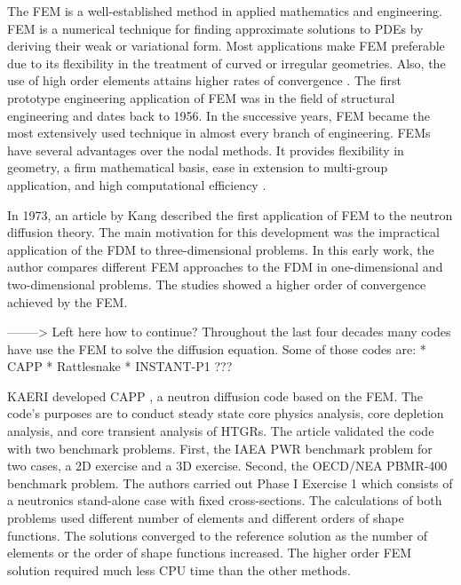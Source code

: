 \documentclass[11pt,letterpaper]{article}
\begin{document}
The \gls{FEM} is a well-established method in applied mathematics and engineering.
\gls{FEM} is a numerical technique for finding approximate solutions to \glspl{PDE} by deriving their weak or variational form.
Most applications make \gls{FEM} preferable due to its flexibility in the treatment of curved or irregular geometries.
Also, the use of high order elements attains higher rates of convergence \cite{cavdar_finite_2004}.
The first prototype engineering application of \gls{FEM} was in the field of structural engineering and dates back to 1956.
In the successive years, \gls{FEM} became the most extensively used technique in almost every branch of engineering.
\glspl{FEM} have several advantages over the nodal methods.
It provides flexibility in geometry, a firm mathematical basis, ease in extension to multi-group application, and high computational efficiency \cite{lee_development_2008}.

In 1973, an article by Kang \cite{kang_finite_1973} described the first application of \gls{FEM} to the neutron diffusion theory.
The main motivation for this development was the impractical application of the \gls{FDM} to three-dimensional problems.
In this early work, the author compares different \gls{FEM} approaches to the \gls{FDM} in one-dimensional and two-dimensional problems.
The studies showed a higher order of convergence achieved by the \gls{FEM}.



--------> Left here
how to continue?
Throughout the last four decades many codes have use the \gls{FEM} to solve the diffusion equation.
Some of those codes are:
* CAPP \cite{lee_development_2011}
* Rattlesnake \cite{wang_rattlesnake_2019}
* INSTANT-P1 ???



\gls{KAERI} developed CAPP \cite{lee_development_2008}, a neutron diffusion code based on the \gls{FEM}.
The code's purposes are to conduct steady state core physics analysis, core depletion analysis, and core transient analysis of \glspl{HTGR}.
The article validated the code with two benchmark problems.
First, the IAEA PWR benchmark problem for two cases, a 2D exercise and a 3D exercise.
Second, the OECD/NEA PBMR-400 benchmark problem.
The authors carried out Phase I Exercise 1 which consists of a neutronics stand-alone case with fixed cross-sections.
The calculations of both problems used different number of elements and different orders of shape functions.
The solutions converged to the reference solution as the number of elements or the order of shape functions increased.
The higher order \gls{FEM} solution required much less CPU time than the other methods.
\end{document}
